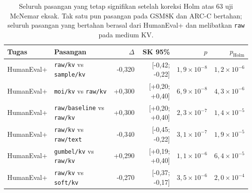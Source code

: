 \begin{table}[htbp]
\centering
\caption{Seluruh pasangan yang tetap signifikan setelah koreksi Holm atas 63 uji McNemar eksak. Tak satu pun pasangan pada GSM8K dan ARC-C bertahan; seluruh pasangan yang bertahan berasal dari HumanEval+ dan melibatkan \texttt{raw} pada medium KV.}
\label{tab:uji-signifikan}
\small
\begin{tabular}{llrrrr}
\hline
Tugas & Pasangan & $\Delta$ & SK 95\% & $p$ & $p_{\text{Holm}}$ \\
\hline
HumanEval+ & \texttt{raw/kv} vs \texttt{sample/kv} & -0,320 & [-0,42; -0,22] & $1,9\times 10^{-8}$ & $1,2\times 10^{-6}$ \\
HumanEval+ & \texttt{moi/kv} vs \texttt{raw/kv} & +0,300 & [+0,20; +0,40] & $6,9\times 10^{-8}$ & $4,3\times 10^{-6}$ \\
HumanEval+ & \texttt{raw/baseline} vs \texttt{raw/kv} & +0,300 & [+0,20; +0,40] & $2,3\times 10^{-7}$ & $1,4\times 10^{-5}$ \\
HumanEval+ & \texttt{raw/kv} vs \texttt{raw/text} & -0,340 & [-0,45; -0,22] & $3,1\times 10^{-7}$ & $1,9\times 10^{-5}$ \\
HumanEval+ & \texttt{gumbel/kv} vs \texttt{raw/kv} & +0,290 & [+0,19; +0,40] & $1,1\times 10^{-6}$ & $6,4\times 10^{-5}$ \\
HumanEval+ & \texttt{raw/kv} vs \texttt{soft/kv} & -0,270 & [-0,37; -0,17] & $3,5\times 10^{-6}$ & $2,0\times 10^{-4}$ \\
\hline
\end{tabular}
\end{table}
